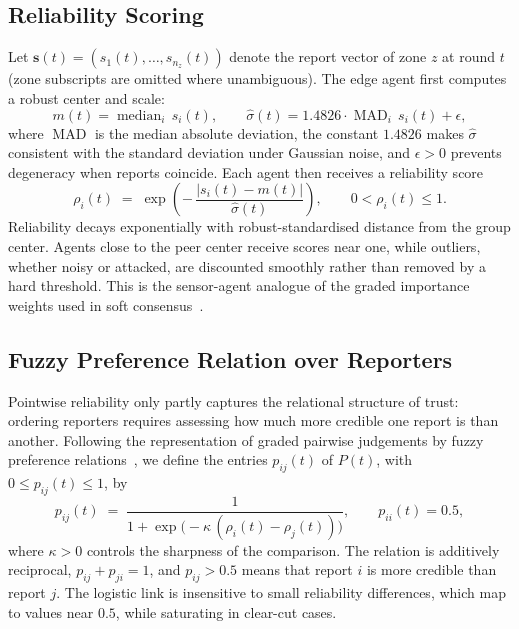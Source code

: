 \documentclass[smartcities,article,submit,moreauthors]{Definitions/mdpi}
\newcommand{\rel}{\rho}
\begin{document}
\subsection{Reliability Scoring}
\label{sec:reliability}

Let $\mathbf{s}(t)=(s_1(t),\dots,s_{n_z}(t))$ denote the report vector of
zone $z$ at round $t$ (zone subscripts are omitted where unambiguous).
The edge agent first computes a robust center and scale:
\begin{equation}
m(t)=\operatorname{median}_i\, s_i(t),
\qquad
\hat{\sigma}(t)=1.4826\cdot\operatorname{MAD}_i\, s_i(t)+\epsilon,
\label{eq:centerscale}
\end{equation}
where $\operatorname{MAD}$ is the median absolute deviation, the
constant $1.4826$ makes $\hat\sigma$ consistent with the standard
deviation under Gaussian noise, and $\epsilon>0$ prevents degeneracy
when reports coincide. Each agent then receives a reliability score
\begin{equation}
\rel_i(t)\;=\;\exp\!\left(-\,\frac{\lvert s_i(t)-m(t)\rvert}
{\hat{\sigma}(t)}\right),\qquad 0<\rel_i(t)\le 1.
\label{eq:reliability}
\end{equation}
Reliability decays exponentially with robust-standardised distance from
the group center. Agents close to the peer center receive scores near
one, while outliers, whether noisy or attacked, are discounted smoothly
rather than removed by a hard threshold. This is the sensor-agent
analogue of the graded importance weights used in soft
consensus~\cite{kacprzyk1986,kacprzyk1988}.

\subsection{Fuzzy Preference Relation over Reporters}
\label{sec:fpr}

Pointwise reliability only partly captures the relational structure of
trust: ordering reporters requires assessing how much more credible one
report is than another. Following the representation of graded pairwise
judgements by fuzzy preference relations~\cite{chiclana1998,herreraviedma2002},
we define the entries $p_{ij}(t)$ of $P(t)$, with
$0\le p_{ij}(t)\le 1$, by
\begin{equation}
p_{ij}(t)\;=\;\frac{1}{1+\exp\!\big(-\kappa\,(\rel_i(t)-\rel_j(t))\big)},
\qquad p_{ii}(t)=0.5,
\label{eq:fpr}
\end{equation}
where $\kappa>0$ controls the sharpness of the comparison. The relation
is additively reciprocal, $p_{ij}+p_{ji}=1$, and $p_{ij}>0.5$ means that
report $i$ is more credible than report $j$. The logistic link is
insensitive to small reliability differences, which map to values near
$0.5$, while saturating in clear-cut cases.
\end{document}
